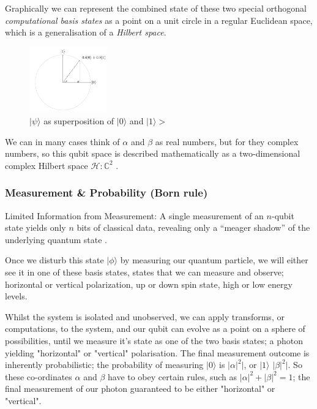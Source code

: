 Graphically we can represent the combined state of these two special orthogonal \emph{computational basis states} 
as a point on a unit circle in a regular Euclidean space, which is a generalisation of a \emph{Hilbert space}.  

\begin{figure}[ht] 
	\begin{adjustbox}{center}
		\includegraphics[width=0.3\textwidth, inner]{figures/unit-vector-2-d-hilbert-state.png}
	\end{adjustbox}
	\caption{$\lvert\psi\rangle$ as superposition of $\lvert0\rangle$ and $\lvert1\rangle>$ }
	\label{fig:2d_hilbert_space}
\end{figure}

We can in many cases think of $\alpha$ and $\beta$ as real numbers, but for they complex numbers, 
so this qubit space is described mathematically as a two-dimensional complex 
Hilbert space $\mathcal{H} : \mathbb{C}^2$ \cite{Preskill:2023} \cite{Nielsen:2010}.


\subsubsection{Measurement \& Probability (Born rule)}

Limited Information from Measurement: A single measurement of an $n$-qubit state yields only $n$ bits of classical data, 
revealing only a \enquote{meager shadow} of the underlying quantum state \cite{Preskill:2023}.


Once we disturb this state $\lvert\phi\rangle$ by measuring our quantum particle, 
we will either see it in one of these basis states, states that we can measure and observe; 
horizontal or vertical polarization, up or down spin state, high or low energy levels.  

Whilst the system is isolated and unobserved, we can apply transforms, or computations, to the system,
and our qubit can evolve as a point on a sphere of possibilities, until we measure it's state as one of the two basis states;
a photon yielding "horizontal" or "vertical" polarisation.  
The final measurement outcome is inherently probabilistic; 
the probability of measuring $\lvert0\rangle$ is $\lvert\alpha\lvert^2|$, or $\lvert1\rangle$ $\lvert\beta\lvert^2|$.
So these co-ordinates $\alpha$ and $\beta$ have to obey certain rules, 
such as $\lvert\alpha\lvert^2 + \lvert\beta\lvert^2 = 1$; 
the final measurement of our photon guaranteed to be either "horizontal" or "vertical".

